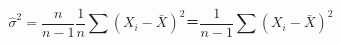 \begin{equation}
	\hat{\sigma}^2=\frac{n}{n-1}\frac{1}{n}\sum(X_i - \bar{X})^2＝\frac{1}{n-1}\sum(X_i - \bar{X})^2
\end{equation}
